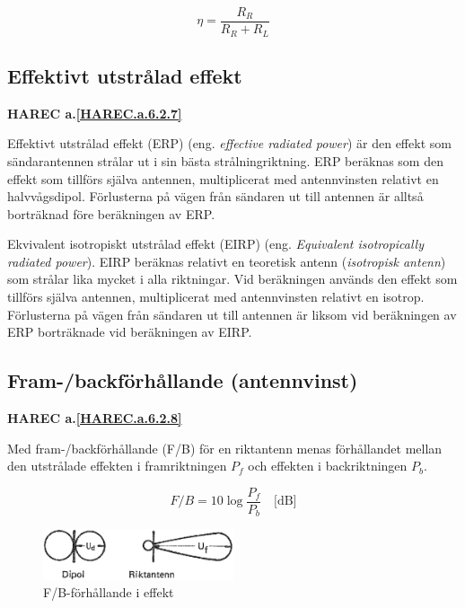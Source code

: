 \[\eta = \frac{R_R}{R_R+R_L}\]

\subsection{Effektivt utstrålad effekt}
\textbf{
HAREC a.\ref{HAREC.a.6.2.7}\label{myHAREC.a.6.2.7}
}

Effektivt utstrålad effekt (ERP) (eng. \emph{effective radiated power}) är den
effekt som sändarantennen strålar ut i sin bästa strålningriktning.
ERP beräknas som den effekt som tillförs själva antennen, multiplicerat med
antennvinsten relativt en halvvågsdipol.
Förlusterna på vägen från sändaren ut till antennen är alltså borträknad före
beräkningen av ERP.

Ekvivalent isotropiskt utstrålad effekt (EIRP)
(eng. \emph{Equivalent isotropically radiated power}).
EIRP beräknas relativt en teoretisk antenn (\emph{isotropisk antenn}) som
strålar lika mycket i alla riktningar.
Vid beräkningen används den effekt som tillförs själva antennen, multiplicerat
med antennvinsten relativt en isotrop.
Förlusterna på vägen från sändaren ut till antennen är liksom vid beräkningen
av ERP borträknade vid beräkningen av EIRP.

\subsection{Fram-/backförhållande (antennvinst)}
\textbf{
HAREC a.\ref{HAREC.a.6.2.8}\label{myHAREC.a.6.2.8}
}

Med fram-/backförhållande (F/B) för en riktantenn menas förhållandet mellan den
utstrålade effekten i framriktningen \(P_f\) och effekten i backriktningen
\(P_b\).

\[ F/B = 10 \log\frac{P_f}{P_b} \quad \text{[dB]} \]

\begin{figure}
  \includegraphics[width=0.5\textwidth]{images/cropped_pdfs/bild_2_6-08.pdf}
  \caption{F/B-förhållande i effekt}
  \label{fig:bildII6-8}
\end{figure}

